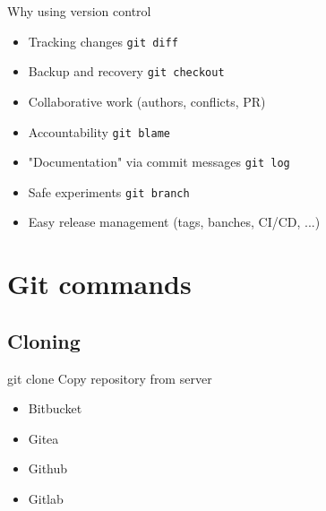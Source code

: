 \documentclass{beamer}
\begin{document}
\begin{frame}{Why using version control}
    \begin{itemize}
        \item<1-> Tracking changes \lstinline{git diff}
        \item<2-> Backup and recovery \lstinline{git checkout}
        \item<3-> Collaborative work (authors, conflicts, PR)
        \item<4-> Accountability \lstinline{git blame}
        \item<5-> "Documentation" via commit messages \lstinline{git log}
        \item<6-> Safe experiments \lstinline{git branch}
        \item<7-> Easy release management (tags, banches, CI/CD, ...)
    \end{itemize}
\end{frame}

\section{Git commands}

\subsection{Cloning}

\begin{frame}{git clone}
     Copy repository from server \pause

    \begin{itemize}
        \item<2-> Bitbucket 
        \item<3-> Gitea
        \item<4-> Github
        \item<5-> Gitlab
    \end{itemize}
\end{frame}
\end{document}
